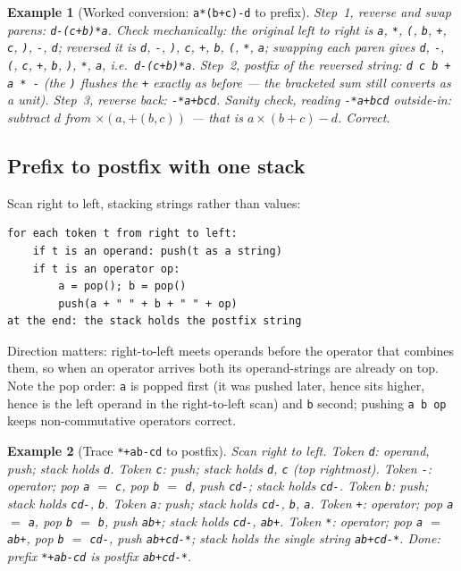 \documentclass[11pt]{article}
\newtheorem{example}{Example}[section]
\begin{document}
\begin{example}[Worked conversion: \texttt{a*(b+c)-d} to prefix]
Step~1, reverse and swap parens: \texttt{d-(c+b)*a}. Check mechanically: the original left to right is \texttt{a}, \texttt{*}, \texttt{(}, \texttt{b}, \texttt{+}, \texttt{c}, \texttt{)}, \texttt{-}, \texttt{d}; reversed it is \texttt{d}, \texttt{-}, \texttt{)}, \texttt{c}, \texttt{+}, \texttt{b}, \texttt{(}, \texttt{*}, \texttt{a}; swapping each paren gives \texttt{d}, \texttt{-}, \texttt{(}, \texttt{c}, \texttt{+}, \texttt{b}, \texttt{)}, \texttt{*}, \texttt{a}, i.e.\ \texttt{d-(c+b)*a}. Step~2, postfix of the reversed string: \texttt{d c b + a * -} (the \texttt{)} flushes the \texttt{+} exactly as before --- the bracketed sum still converts as a unit). Step~3, reverse back: \texttt{-*a+bcd}. Sanity check, reading \texttt{-*a+bcd} outside-in: subtract $d$ from $\times(a, +(b,c))$ --- that is $a \times (b+c) - d$. Correct. 
\end{example}

\subsection{Prefix to postfix with one stack}

Scan right to left, stacking strings rather than values:
{\footnotesize
\begin{verbatim}
for each token t from right to left:
    if t is an operand: push(t as a string)
    if t is an operator op:
        a = pop(); b = pop()
        push(a + " " + b + " " + op)
at the end: the stack holds the postfix string
\end{verbatim}
}
Direction matters: right-to-left meets operands before the operator that combines them, so when an operator arrives both its operand-strings are already on top. Note the pop order: \texttt{a} is popped first (it was pushed later, hence sits higher, hence is the left operand in the right-to-left scan) and \texttt{b} second; pushing \texttt{a b op} keeps non-commutative operators correct.

\begin{example}[Trace \texttt{*+ab-cd} to postfix]
Scan right to left. Token \texttt{d}: operand, push; stack holds \texttt{d}. Token \texttt{c}: push; stack holds \texttt{d}, \texttt{c} (top rightmost). Token \texttt{-}: operator; pop \texttt{a} $=$ \texttt{c}, pop \texttt{b} $=$ \texttt{d}, push \texttt{cd-}; stack holds \texttt{cd-}. Token \texttt{b}: push; stack holds \texttt{cd-}, \texttt{b}. Token \texttt{a}: push; stack holds \texttt{cd-}, \texttt{b}, \texttt{a}. Token \texttt{+}: operator; pop \texttt{a} $=$ \texttt{a}, pop \texttt{b} $=$ \texttt{b}, push \texttt{ab+}; stack holds \texttt{cd-}, \texttt{ab+}. Token \texttt{*}: operator; pop \texttt{a} $=$ \texttt{ab+}, pop \texttt{b} $=$ \texttt{cd-}, push \texttt{ab+cd-*}; stack holds the single string \texttt{ab+cd-*}. Done: prefix \texttt{*+ab-cd} is postfix \texttt{ab+cd-*}.
\end{example}
\end{document}
